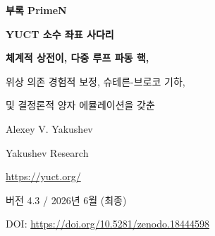 \documentclass[11pt,a4paper]{article}
\newcommand{\kappac}{\kappa_c}
\newcommand{\Seven}{S_{\mathrm{even}}}
\begin{document}
	
	\begin{titlepage}
		\centering
		\vspace*{0cm}
		
		{\Huge\bfseries 부록 PrimeN\par}
		\vspace{0.5cm}
		{\Large\bfseries YUCT 소수 좌표 사다리\par}
		\vspace{0.3cm}
		{\Large\bfseries 체계적 상전이, 다중 루프 파동 핵,\par
			위상 의존 경험적 보정, 슈테른-브로코 기하,\par
			및 결정론적 양자 에뮬레이션을 갖춘\par}
		\vspace{1.0cm}
		
		{\large Alexey V. Yakushev\par}
		\vspace{0.3cm}
		{\normalsize Yakushev Research\par}
		{\normalsize \url{https://yuct.org/}\par}
		
		\vspace{0.5cm}
		{\normalsize 버전 4.3 / 2026년 6월 (최종)\par}
		\vspace{0.3cm}
		{\normalsize DOI: \url{https://doi.org/10.5281/zenodo.18444598}\par}
		
		\vfill
		
		\begin{abstract}
			\noindent
			우리는 소수 분포와 Yakushev 통합 조정 이론(YUCT) 사이의 엄밀한 연관성을 확립한다. 보편 오차 법칙 \(\varepsilon = \kappac \alpha K_{\mathrm{eff}}^{-\beta}\) (\(\beta=2/3\), \(\kappac=1/3\))은 \(n\)번째 소수 \(p_n\)의 고전적 Rosser 근사 주변의 점근적 변동을 지배한다. YUCT의 대수 루프로부터 \textbf{이론적 보정} \(p_n \approx R_n - \frac{\Seven}{2}\, n^{1-\beta}\,\ln n\)을 유도하며, 이는 \textbf{자유 매개변수를 포함하지 않으며} 소수 편차의 매끄러운 추세에 대한 점근적으로 정확한 기술을 제공한다 (정리~4).
			
			\textbf{이 버전의 새로운 점:} 우리는 진공 격자의 \textbf{캐스케이드 상전이}를 발견하고 수학적으로 유도한다. 이는 임계 지수 \(N_f = 80,\,96.5,\,113,\,\dots\) (단계 \(\Delta N = 16.5\), 이는 바일 페르미온 수 \(L_0 = 96\)과 짝수 섹터 불변량 \(\Seven = 0.8\)에서 직접 유도됨)에서 첫 번째 루프 보정의 부호 반전으로 나타난다. 연속 삼각 위상 연산자가 수동 임계값을 대체하여 모든 규모에서 올바른 부호 선택을 보장한다.
			

\end{abstract}
\end{titlepage}
\end{document}

